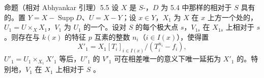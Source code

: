 \begin{SGAresult}{命题（相对 Abhyankar 引理）}{5.5}
设 $X$ 是 $S$-，$D$ 为 5.4 中那样的相对于 $S$ 具有的。置 $Y=X-\operatorname{Supp}D$、$U=X-Y$；设 $x\in Y$，$X_1$ 为 $X$ 在 $x$ 上方一个处的，$U_1=U\times_X X_1$，$V_1$ 为 $U_1$ 的一个。设对 $S$ 的每个极大点 $s$，$V_{1s}$ 在 $X_{1s}$ 上相对于 $s$ 。则存在与 $k(x)$ 的特征 $p$ 互素的整数 $n_i$（$i\in I(x)$），使得置
\[X'_1=X_1[T_i]_{i\in I(x)}/(T_i^{n_i}-f_i),\]
$U'_1=U_1\times_{X_1}X'_1$ 等后，$U'_1$ 的 $V'_1$ 可在相差唯一的意义下唯一延拓为 $X'_1$ 的。特别地，$V_1$ 在 $X_1$ 上相对于 $S$ 。
\end{SGAresult}
